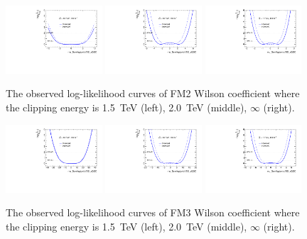\begin{figure}[ht]
    \centering
    \includegraphics[width=0.32\textwidth]{figures/aQGC/profileFM21500}
    	\includegraphics[width=0.32\textwidth]{figures/aQGC/profileFM22000}
        \includegraphics[width=0.32\textwidth]{figures/aQGC/profileFM2inf}
        \caption{The observed log-likelihood curves of FM2 Wilson coefficient where the clipping energy is 1.5~TeV (left), 2.0~TeV (middle), $\infty$ (right).}
        \label{fig:ProfileLL}
\end{figure}
\begin{figure}[ht]
    \centering
    \includegraphics[width=0.32\textwidth]{figures/aQGC/profileFM31500}
    	\includegraphics[width=0.32\textwidth]{figures/aQGC/profileFM32000}
        \includegraphics[width=0.32\textwidth]{figures/aQGC/profileFM3inf}
        \caption{The observed log-likelihood curves of FM3 Wilson coefficient where the clipping energy is 1.5~TeV (left), 2.0~TeV (middle), $\infty$ (right).}
        \label{fig:ProfileLL}
\end{figure}
